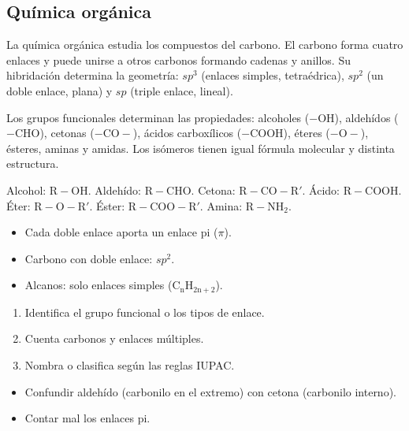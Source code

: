 \documentclass[10pt,a4paper,twocolumn]{article}
\begin{document}
\subsection{Química orgánica}

La química orgánica estudia los compuestos del carbono. El carbono forma cuatro enlaces y puede unirse a otros carbonos formando cadenas y anillos. Su hibridación determina la geometría: $sp^3$ (enlaces simples, tetraédrica), $sp^2$ (un doble enlace, plana) y $sp$ (triple enlace, lineal).

Los grupos funcionales determinan las propiedades: alcoholes ($-\mathrm{OH}$), aldehídos ($-\mathrm{CHO}$), cetonas ($-\mathrm{CO}-$), ácidos carboxílicos ($-\mathrm{COOH}$), éteres ($-\mathrm{O}-$), ésteres, aminas y amidas. Los isómeros tienen igual fórmula molecular y distinta estructura.

\begin{definicion}
Alcohol: $\mathrm{R{-}OH}$. Aldehído: $\mathrm{R{-}CHO}$. Cetona: $\mathrm{R{-}CO{-}R'}$. Ácido: $\mathrm{R{-}COOH}$. Éter: $\mathrm{R{-}O{-}R'}$. Éster: $\mathrm{R{-}COO{-}R'}$. Amina: $\mathrm{R{-}NH_2}$.
\end{definicion}

\begin{ideasclave}
\begin{itemize}
  \item Cada doble enlace aporta un enlace pi ($\pi$).
  \item Carbono con doble enlace: $sp^2$.
  \item Alcanos: solo enlaces simples ($\mathrm{C_nH_{2n+2}}$).
\end{itemize}
\end{ideasclave}

\begin{metodo}
\begin{enumerate}
  \item Identifica el grupo funcional o los tipos de enlace.
  \item Cuenta carbonos y enlaces múltiples.
  \item Nombra o clasifica según las reglas IUPAC.
\end{enumerate}
\end{metodo}

\begin{errorfrecuente}
\begin{itemize}
  \item Confundir aldehído (carbonilo en el extremo) con cetona (carbonilo interno).
  \item Contar mal los enlaces pi.
\end{itemize}
\end{errorfrecuente}
\end{document}
